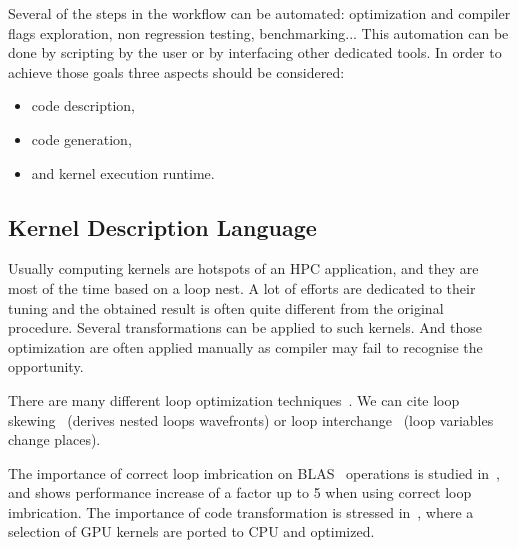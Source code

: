 \documentclass[11pt, a4paper, twoside]{montblanc}
\begin{document}
Several of the steps in the workflow can be automated: optimization and compiler
flags exploration, non regression testing, benchmarking... This automation can
be done by scripting by the user or by interfacing other dedicated tools. In
order to achieve those goals three aspects should be considered:
\begin{itemize}
\item code description,
\item code generation,
\item and kernel execution runtime.
\end{itemize}


  \subsection{Kernel Description Language}



Usually computing kernels are hotspots of an HPC application, and they are most
of the time based on a loop nest. A lot of efforts are dedicated to their tuning
and the obtained result is often quite different from the original procedure.
Several transformations can be applied to such kernels. And those optimization
are often applied manually as compiler may fail to recognise the opportunity.

There are many different loop optimization techniques~\cite{wolf1991loop}. We
can cite loop skewing~\cite{wolfe1986loops} (derives nested loops wavefronts)
or loop interchange~\cite{allen1984automatic} (loop variables change places).

The importance of  correct loop imbrication on BLAS~\cite{lawson1979basic}
operations is studied in~\cite{soliman2009performance}, and shows performance
increase of a factor up to 5 when using correct loop imbrication. The importance
of code transformation is stressed in~\cite{ye2011porting}, where a selection of GPU
kernels are ported to CPU and optimized.
\end{document}
